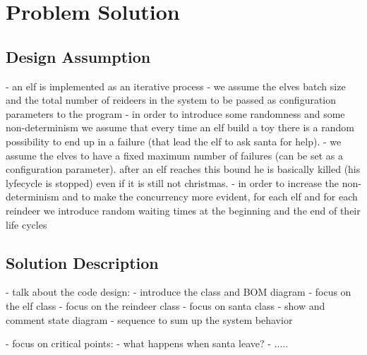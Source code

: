 \chapter{Problem Solution}
\label{chap:solution}

\section{Design Assumption}

- an elf is implemented as an iterative process 
- we assume the elves batch size and the total number of reideers in the system to be passed as configuration parameters to the program
- in order to introduce some randomness and some non-determinism we assume that every time an elf build a toy there is a random possibility to end up in a failure (that lead the elf to ask santa for help).
- we assume the elves to have a fixed maximum number of failures (can be set as a configuration parameter). after an elf reaches this bound he is basically killed (his lyfecycle is stopped) even if it is still not christmas.
- in order to increase the non-determinism and to make the concurrency more evident, for each elf and for each reindeer we introduce random waiting times at the beginning and the end of their life cycles


\section{Solution Description}

- talk about the code design: 
- introduce the class and BOM diagram
- focus on the elf class
- focus on the reindeer class
- focus on santa class
- show and comment state diagram
- sequence to sum up the system behavior

- focus on critical points:
- what happens when santa leave?
- .....
